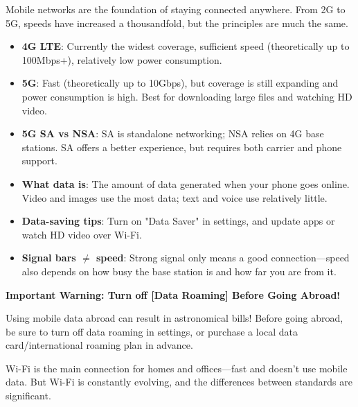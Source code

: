 Mobile networks are the foundation of staying connected anywhere. From 2G to 5G, speeds have increased a thousandfold, but the principles are much the same.


\begin{itemize}
  \item \textbf{4G LTE}: Currently the widest coverage, sufficient speed (theoretically up to 100Mbps+), relatively low power consumption.
  \item \textbf{5G}: Fast (theoretically up to 10Gbps), but coverage is still expanding and power consumption is high. Best for downloading large files and watching HD video.
  \item \textbf{5G SA vs NSA}: SA is standalone networking; NSA relies on 4G base stations. SA offers a better experience, but requires both carrier and phone support.
\end{itemize}


\begin{itemize}
  \item \textbf{What data is}: The amount of data generated when your phone goes online. Video and images use the most data; text and voice use relatively little.
  \item \textbf{Data-saving tips}: Turn on "Data Saver" in settings, and update apps or watch HD video over Wi-Fi.
  \item \textbf{Signal bars $\neq$ speed}: Strong signal only means a good connection—speed also depends on how busy the base station is and how far you are from it.
\end{itemize}

\textbf{Important Warning: Turn off [Data Roaming] Before Going Abroad!}\par

Using mobile data abroad can result in astronomical bills! Before going abroad, be sure to turn off data roaming in settings, or purchase a local data card/international roaming plan in advance.


Wi-Fi is the main connection for homes and offices—fast and doesn't use mobile data. But Wi-Fi is constantly evolving, and the differences between standards are significant.


